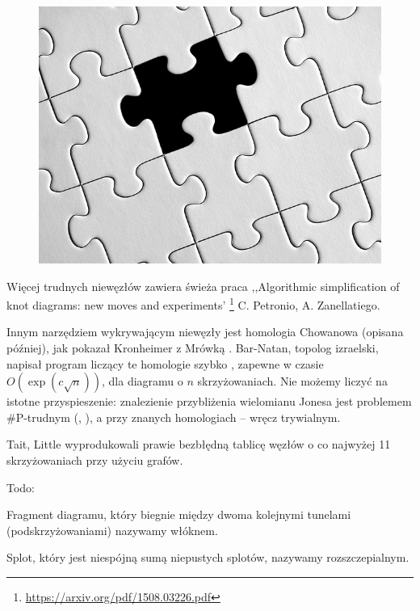 \begin{figure}[H]
	\begin{minipage}[b]{.32\linewidth}
		\centering
		\includegraphics[width=\linewidth]{../data/missing.jpg}
	\end{minipage}
\end{figure}

Więcej trudnych niewęzłów zawiera świeża praca
,,Algorithmic simplification of knot diagrams: new moves and experiments'
\footnote{\url{https://arxiv.org/pdf/1508.03226.pdf}}
C. Petronio, A. Zanellatiego.

Innym narzędziem wykrywającym niewęzły jest homologia Chowanowa (opisana później),
jak pokazał Kronheimer z Mrówką \cite{kronheimer11}.
Bar-Natan, topolog izraelski, napisał program liczący te homologie szybko \cite{barnatan07},
zapewne w czasie $O(\exp(c \sqrt n))$, dla diagramu o $n$ skrzyżowaniach.
Nie możemy liczyć na istotne przyspieszenie:
znalezienie przybliżenia wielomianu Jonesa jest problemem \#P-trudnym (\cite{kuperberg15}, \cite{vertigan05}),
a przy znanych homologiach -- wręcz trywialnym.

Tait, Little wyprodukowali prawie bezbłędną tablicę węzłów o co najwyżej 11 skrzyżowaniach przy użyciu grafów.

Todo:
\begin{definition}[włókno]
	Fragment diagramu, który biegnie między dwoma kolejnymi tunelami (podskrzyżowaniami) nazywamy włóknem.
\end{definition}

\begin{definition}[rozszczepialność]
	Splot, który jest niespójną sumą niepustych splotów, nazywamy rozszczepialnym.
\end{definition}